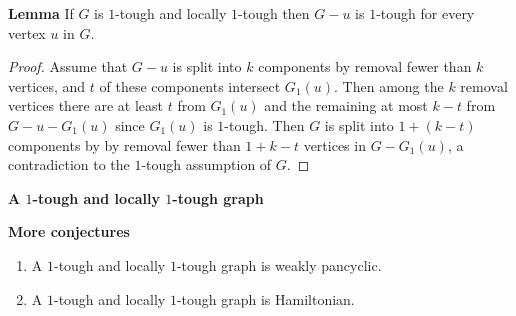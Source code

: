 \documentclass{beamer}
\theoremstyle{plain}
\theoremstyle{definition}
\begin{document}
\begin{frame}{\bf Lemma}
If $G$ is $1$-tough and locally $1$-tough then $G-u$ is $1$-tough for every vertex $u$ in $G$.

\begin{proof}
Assume that $G-u$ is split into $k$ components by removal fewer than $k$ vertices, and $t$ of these components intersect $G_1(u)$.
Then among the $k$ removal vertices there are at least $t$ from $G_1(u)$ and the remaining at most $k-t$ from $G-u-G_1(u)$ since $G_1(u)$ is $1$-tough.
Then $G$ is split into $1+(k-t)$ components by  by removal fewer than $1+k-t$ vertices in $G-G_1(u)$, a contradiction to the $1$-tough assumption of $G$.
\end{proof}
\end{frame}


\begin{frame}{\bf A $1$-tough and locally $1$-tough graph}
\begin{center}
\end{center}
\end{frame}

\begin{frame}{\bf More conjectures}
\begin{enumerate}
\item  A $1$-tough and locally $1$-tough graph is weakly pancyclic.
\item  A $1$-tough and locally $1$-tough graph is Hamiltonian.
\end{enumerate}

\end{frame}
\end{document}
